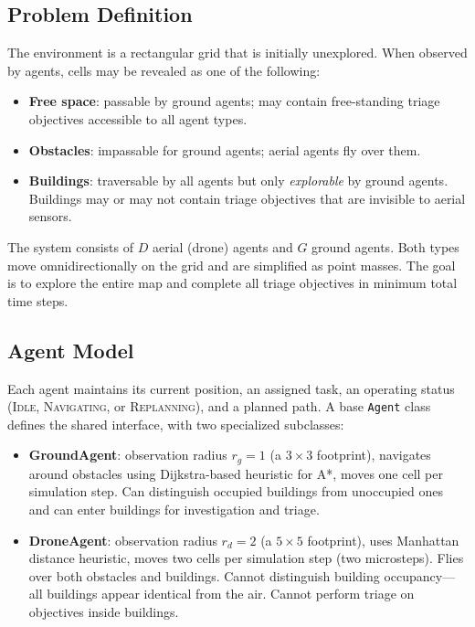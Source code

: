 \documentclass[conference]{IEEEtran}
\begin{document}
\subsection{Problem Definition}

The environment is a rectangular grid that is initially unexplored. When observed by agents, cells may be revealed as one of the following:
\begin{itemize}
    \item \textbf{Free space}: passable by ground agents; may contain free-standing triage objectives accessible to all agent types.
    \item \textbf{Obstacles}: impassable for ground agents; aerial agents fly over them.
    \item \textbf{Buildings}: traversable by all agents but only \emph{explorable} by ground agents. Buildings may or may not contain triage objectives that are invisible to aerial sensors.
\end{itemize}

The system consists of $D$ aerial (drone) agents and $G$ ground agents. Both types move omnidirectionally on the grid and are simplified as point masses. The goal is to explore the entire map and complete all triage objectives in minimum total time steps.

\subsection{Agent Model}

Each agent maintains its current position, an assigned task, an operating status (\textsc{Idle}, \textsc{Navigating}, or \textsc{Replanning}), and a planned path. A base \texttt{Agent} class defines the shared interface, with two specialized subclasses:

\begin{itemize}
    \item \textbf{GroundAgent}: observation radius $r_g = 1$ (a $3 \times 3$ footprint), navigates around obstacles using Dijkstra-based heuristic for A*, moves one cell per simulation step. Can distinguish occupied buildings from unoccupied ones and can enter buildings for investigation and triage.
    \item \textbf{DroneAgent}: observation radius $r_d = 2$ (a $5 \times 5$ footprint), uses Manhattan distance heuristic, moves two cells per simulation step (two microsteps). Flies over both obstacles and buildings. Cannot distinguish building occupancy---all buildings appear identical from the air. Cannot perform triage on objectives inside buildings.
\end{itemize}
\end{document}
